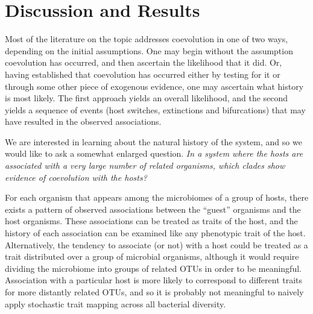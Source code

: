 \section{Discussion and Results}

Most of the literature on the topic addresses coevolution in one of two ways, depending on the initial assumptions. One may begin without the assumption coevolution has occurred, and then ascertain the likelihood that it did. Or, having established that coevolution has occurred either by testing for it or through some other piece of exogenous evidence, one may ascertain what history is most likely. The first approach yields an overall likelihood, and the second yields a sequence of events (host switches, extinctions and bifurcations) that may have resulted in the observed associations.

We are interested in learning about the natural history of the system, and so we would like to ask a somewhat enlarged question. {\em In a system where the hosts are associated with a very large number of related organisms, which clades show evidence of coevolution with the hosts?}

For each organism that appears among the microbiomes of a group of hosts, there exists a pattern of observed associations between the ``guest'' organisms and the host organisms. These associations can be treated as traits of the host, and the history of each association can be examined like any phenotypic trait of the host. Alternatively, the tendency to associate (or not) with a host could be treated as a trait distributed over a group of microbial organisms, although it would require dividing the microbiome into groups of related OTUs in order to be meaningful. Association with a particular host is more likely to correspond to different traits for more distantly related OTUs, and so it is probably not meaningful to naively apply stochastic trait mapping across all bacterial diversity.



